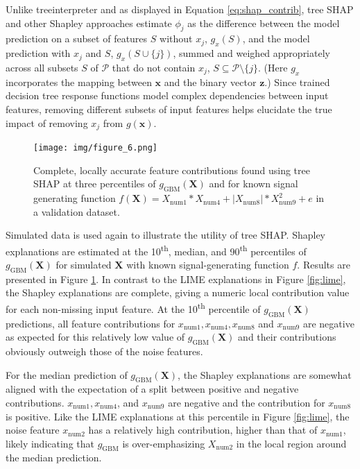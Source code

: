 \documentclass[sigconf, review]{acmart}
\begin{document}
\noindent Unlike treeinterpreter and as displayed in Equation \ref{eq:shap_contrib}, tree SHAP and other Shapley approaches estimate $\phi_j$ as the difference between the model prediction on a subset of features $S$ without $x_j$, $g_x(S)$, and the model prediction with $x_j$ and $S$, $g_x(S \cup \{j\})$, summed and weighed appropriately across all subsets $S$ of $\mathcal{P}$ that do not contain $x_j$, $S \subseteq \mathcal{P} \setminus \{j\}$. (Here $g_x$ incorporates the mapping between $\mathbf{x}$ and the binary vector $\mathbf{z}$.) Since trained decision tree response functions model complex dependencies between input features, removing different subsets of input features helps elucidate the true impact of removing $x_j$ from $g(\mathbf{x})$.

\begin{figure}[htb]
	\begin{center}
		\texttt{[image: img/figure\_6.png]}
		\caption{Complete, locally accurate feature contributions found using tree SHAP at three percentiles of $g_{\text{GBM}}(\mathbf{X})$ and for known signal generating function $f(\mathbf{X}) = X_{\text{num}1} * X_{\text{num}4} + |X_{\text{num}8}| * X_{\text{num}9}^2 + e$ in a validation dataset.}
		\label{fig:shap}
	\end{center}
\end{figure}

Simulated data is used again to illustrate the utility of tree SHAP. Shapley explanations are estimated at the 10\textsuperscript{th}, median, and 90\textsuperscript{th} percentiles of $g_{\text{GBM}}(\mathbf{X})$ for simulated $\mathbf{X}$ with known signal-generating function $f$. Results are presented in Figure \ref{fig:shap}. In contrast to the LIME explanations in Figure \ref{fig:lime}, the Shapley explanations are complete, giving a numeric local contribution value for each non-missing input feature. At the 10\textsuperscript{th} percentile of $g_{\text{GBM}}(\mathbf{X})$ predictions, all feature contributions for $x_{\text{num}1}, x_{\text{num}4}, x_{\text{num}8}$ and $x_{\text{num}9}$ are negative as expected for this relatively low value of $g_{\text{GBM}}(\mathbf{X})$ and their contributions obviously outweigh those of the noise features.

For the median prediction of $g_{\text{GBM}}(\mathbf{X})$, the Shapley explanations are somewhat aligned with the expectation of a split between positive and negative contributions. $x_{\text{num}1}, x_{\text{num}4}$, and $x_{\text{num}9}$ are negative and the contribution for $x_{\text{num}8}$ is positive. Like the LIME explanations at this percentile in Figure \ref{fig:lime}, the noise feature $x_{\text{num}2}$ has a relatively high contribution, higher than that of $x_{\text{num}1}$, likely indicating that $g_{\text{GBM}}$ is over-emphasizing $X_{\text{num}2}$ in the local region around the median prediction. 
\end{document}
